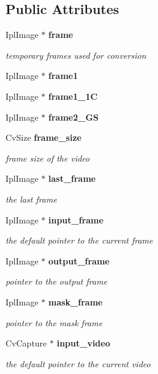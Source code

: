 \subsection*{Public Attributes}
\begin{CompactItemize}
\item 
IplImage $\ast$ {\bf frame}
\begin{CompactList}\small\item\em temporary frames used for conversion \item\end{CompactList}\item 
IplImage $\ast$ {\bf frame1}
\item 
IplImage $\ast$ {\bf frame1\_\-1C}
\item 
IplImage $\ast$ {\bf frame2\_\-GS}
\item 
CvSize {\bf frame\_\-size}
\begin{CompactList}\small\item\em frame size of the video \item\end{CompactList}\item 
IplImage $\ast$ {\bf last\_\-frame}
\begin{CompactList}\small\item\em the last frame \item\end{CompactList}\item 
IplImage $\ast$ {\bf input\_\-frame}
\begin{CompactList}\small\item\em the default pointer to the current frame \item\end{CompactList}\item 
IplImage $\ast$ {\bf output\_\-frame}
\begin{CompactList}\small\item\em pointer to the output frame \item\end{CompactList}\item 
IplImage $\ast$ {\bf mask\_\-frame}
\begin{CompactList}\small\item\em pointer to the mask frame \item\end{CompactList}\item 
CvCapture $\ast$ {\bf input\_\-video}
\begin{CompactList}\small\item\em the default pointer to the current video \item\end{CompactList}\end{CompactItemize}
